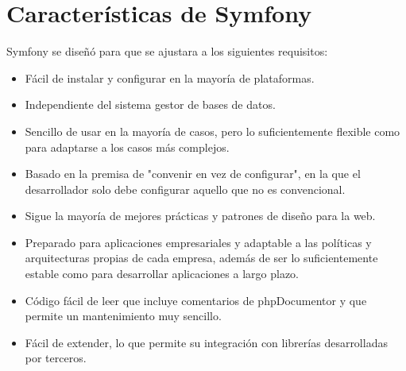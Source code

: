 \section{Características de Symfony}

Symfony se diseñó para que se ajustara a los siguientes requisitos:

\begin{itemize}
    \item Fácil de instalar y configurar en la mayoría de plataformas.
    \item Independiente del sistema gestor de bases de datos.
    \item Sencillo de usar en la mayoría de casos, pero lo suficientemente flexible como para adaptarse a los casos más complejos.
    \item Basado en la premisa de "convenir en vez de configurar", en la que el desarrollador solo debe configurar aquello que no es convencional.
    \item Sigue la mayoría de mejores prácticas y patrones de diseño para la web.
    \item Preparado para aplicaciones empresariales y adaptable a las políticas y arquitecturas propias de cada empresa, además de ser lo suficientemente estable como para desarrollar aplicaciones a largo plazo.
    \item Código fácil de leer que incluye comentarios de phpDocumentor y que permite un mantenimiento muy sencillo.
    \item Fácil de extender, lo que permite su integración con librerías desarrolladas por terceros. 
\end{itemize}